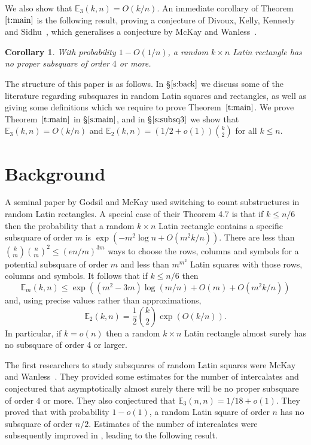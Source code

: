 \documentclass[12pt]{article}
\newtheorem{cor}[thm]{Corollary}
\theoremstyle{definition}
\numberwithin{equation}{section}
\def\sref#1{\S$\ref{#1}$}
\def\tref#1{Theorem~$\ref{#1}$}
\renewcommand{\leq}{\leqslant}
\renewcommand{\le}{\leqslant}
\newcommand{\E}{\mathbb{E}}
\begin{document}
	We also show that $\E_3(k,n)=O(k/n)$. An immediate corollary of
	\tref{t:main} is the following result, proving a conjecture of
	Divoux, Kelly, Kennedy and Sidhu~\cite{subsqrandom}, which generalises
	a conjecture by McKay and Wanless~\cite{manysubsq}.
	
	\begin{cor}\label{c:main}
		With probability $1-O(1/n)$, a random $k \times n$ Latin rectangle has
		no proper subsquare of order $4$ or more.
	\end{cor}
	
	
	The structure of this paper is as follows. In \sref{s:back} we discuss
	some of the literature regarding subsquares in random Latin squares
	and rectangles, as well as giving some definitions which we require to
	prove \tref{t:main}. We prove \tref{t:main} in \sref{s:main}, and in
	\sref{s:subsq3} we show that $\E_3(k, n)=O(k/n)$ and
        $\mathbb{E}_2(k,n)=(1/2+o(1))\binom{k}{2}$ for all $k\le n$.
	
	\section{Background}\label{s:back}
	
	A seminal paper by Godsil and McKay \cite{GM91} used switching
	to count substructures in random Latin rectangles.  A special
	case of their Theorem 4.7 is that if $k \leq n/6$ then the
	probability that a random $k\times n$ Latin rectangle contains
	a specific subsquare of order $m$ is $\exp(-m^2\log
	n+O(m^2k/n))$.  There are less than
	$\binom{k}{m}\binom{n}{m}^2\le(en/m)^{3m}$ ways to choose the
	rows, columns and symbols for a potential subsquare of order
	$m$ and less than $m^{m^2}$ Latin squares with those rows,
	columns and symbols. It follows that if $k \leq n/6$ then
	\[\E_m(k,n)\le\exp((m^2-3m)\log(m/n)+O(m)+O(m^2k/n))\]
	and, using precise values rather than approximations,
	\begin{equation}\label{e:E2smallk}
		\E_2(k,n)=\frac12\binom{k}2\exp(O(k/n)).
	\end{equation}
	In particular, if $k=o(n)$ then a random $k\times n$ Latin rectangle
	almost surely has no subsquare of order 4 or larger. 
	
	
	The first researchers to study subsquares of random Latin
	squares were McKay and Wanless~\cite{manysubsq}. They provided
	some estimates for the number of intercalates and conjectured that
	asymptotically almost surely there will be no proper subsquare
	of order $4$ or more. They also conjectured that
	$\E_3(n,n)=1/18+o(1)$. They proved that with probability
	$1-o(1)$, a random Latin square of order $n$ has no subsquare
	of order $n/2$.  Estimates of the number of intercalates were
	subsequently improved in \cite{cycstrucrandom,KSS,KSSS,KS},
	leading to the following result.
	
\end{document}
